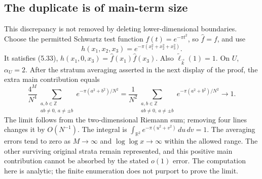 \documentclass[10pt]{article}
\begin{document}
\subsection*{The duplicate is of main-term size}
This discrepancy is not removed by deleting lower-dimensional boundaries. Choose the permitted Schwartz test function \(f(t)=e^{-\pi t^2}\), so \(\widehat f=f\), and use \[h(x_1,x_2,x_3)=e^{-\pi(x_1^2+x_2^2+x_3^2)}.\] It satisfies (5.33), \(h(x_1,0,x_3)=\widehat f(x_1)\widehat f(x_3)\). Also \(\widetilde\ell_{\vec k}(1)=1\). On \(U\), \(\alpha_U=2\). After the stratum averaging asserted in the next display of the proof, the extra main contribution equals \[\frac{4^M}{N^4}
 \sum_{\substack{a,b\in\mathbb Z\\ab\ne0,\ a\ne\pm b}}
           e^{-\pi(a^2+b^2)/N^2}
 =
 \frac1{N^2}
 \sum_{\substack{a,b\in\mathbb Z\\ab\ne0,\ a\ne\pm b}}
           e^{-\pi(a^2+b^2)/N^2}
 \longrightarrow 1.\] The limit follows from the two-dimensional Riemann sum; removing four lines changes it by \(O(N^{-1})\). The integral is \(\int_{\mathbb R^2}e^{-\pi(u^2+v^2)}\,du\,dv=1\). The averaging errors tend to zero as \(M\to\infty\) and \(\log\log x\to\infty\) within the allowed range. The other surviving original strata remain represented, and this positive main contribution cannot be absorbed by the stated \(o(1)\) error. The computation here is analytic; the finite enumeration does not purport to prove the limit.\par
\end{document}

